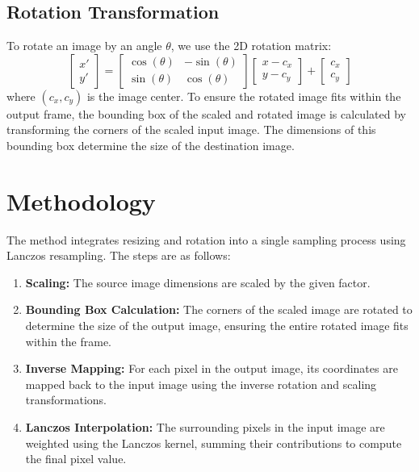 \documentclass{article}
\begin{document}
\subsection{Rotation Transformation}
To rotate an image by an angle \(\theta\), we use the 2D rotation matrix:
\[
\begin{bmatrix}
x' \\
y'
\end{bmatrix}
= 
\begin{bmatrix}
\cos(\theta) & -\sin(\theta) \\
\sin(\theta) & \cos(\theta)
\end{bmatrix}
\begin{bmatrix}
x - c_x \\
y - c_y
\end{bmatrix}
+
\begin{bmatrix}
c_x \\
c_y
\end{bmatrix}
\]
where \((c_x, c_y)\) is the image center. To ensure the rotated image fits within the output frame, the bounding box of the scaled and rotated image is calculated by transforming the corners of the scaled input image. The dimensions of this bounding box determine the size of the destination image.

\section{Methodology}

The method integrates resizing and rotation into a single sampling process using Lanczos resampling. The steps are as follows:

\begin{enumerate}
    \item \textbf{Scaling:} The source image dimensions are scaled by the given factor.
    \item \textbf{Bounding Box Calculation:} The corners of the scaled image are rotated to determine the size of the output image, ensuring the entire rotated image fits within the frame.
    \item \textbf{Inverse Mapping:} For each pixel in the output image, its coordinates are mapped back to the input image using the inverse rotation and scaling transformations.
    \item \textbf{Lanczos Interpolation:} The surrounding pixels in the input image are weighted using the Lanczos kernel, summing their contributions to compute the final pixel value.
\end{enumerate}
\end{document}
